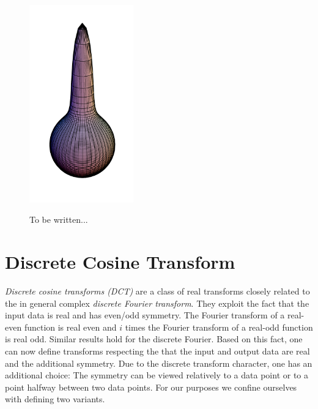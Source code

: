 \begin{figure}[tb]
     {\includegraphics[width=0.4\textwidth]{images/p_085.png}}
  \caption{To be written...}
  \label{Basics:Figure:PoissonKernel2}
\end{figure}

\label{Basics:SphericalKernels}

\section{Discrete Cosine Transform}
\label{Basics:DiscreteCosineTransform}

\emph{Discrete cosine transforms (DCT)} are a class of real transforms closely related to the 
in general complex \emph{discrete Fourier transform}. They exploit the fact that the 
input data is real and has even/odd symmetry. The Fourier transform of a real-even 
function is real even and $i$ times the Fourier transform of a real-odd function is real 
odd. Similar results hold for the discrete Fourier. Based on this fact, one can now define 
transforms respecting the that the input and output data are real and the additional symmetry.
Due to the discrete transform character, one has an additional choice: The symmetry can be 
viewed relatively to a data point or to a point halfway between two data points. For our 
purposes we confine ourselves with defining two variants.

